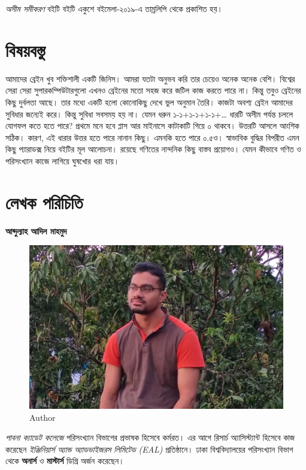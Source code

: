 \documentclass[
]{book}
\begin{document}
\emph{অসীম সমীকরণ} বইটি বইটি একুশে বইমেলা-২০১৯-এ তাম্রলিপি থেকে প্রকাশিত হয়।

\hypertarget{ux9acux9b7ux9dfux9acux9b8ux9a4}{%
\section{বিষয়বস্তু}\label{ux9acux9b7ux9dfux9acux9b8ux9a4}}

আমাদের ব্রেইন খুব শক্তিশালী একটি জিনিস। আমরা যতটা অনুভব করি তার চেয়েও অনেক অনেক বেশি। বিশ্বের সেরা সেরা সুপারকম্পিউটারগুলো এখনও ব্রেইনের মতো সহজ করে জটিল কাজ করতে পারে না। কিন্তু তবুও ব্রেইনের কিছু দুর্বলতা আছে। তার মধ্যে একটি হলো কোনোকিছু দেখে ভুল অনুমান তৈরি। কাজটা অবশ্য ব্রেইন আমাদের সুবিধার জন্যেই করে। কিন্তু সুবিধা সবসময় হয় না। যেমন ধরুন ১-১+১-১+১-১+\ldots{} ধারটি অসীম পর্যন্ত চললে যোগফল কতে হতে পারে? প্রথমে মনে হবে প্লাস আর মাইনাসে কাটাকাটি গিয়ে ০ থাকবে। উত্তরটি আসলে আংশিক সঠিক। কারণ, এই ধারার উত্তর হতে পারে নানান কিছু। এমনকি হতে পারে ০.৫ও। স্বাভাবিক বুদ্ধির বিপরীত এমন কিছু প্যারাডক্স নিয়ে বইটির মূল আলোচনা। রয়েছে গণিতের নান্দনিক কিছু বাস্তব প্রয়োগও। যেমন কীভাবে গণিত ও পরিসংখ্যান কাজে লাগিয়ে ঘুষখোর ধরা যায়।

\hypertarget{ux9b2ux996ux995-ux9aaux9b0ux99aux9a4}{%
\section{লেখক পরিচিতি}\label{ux9b2ux996ux995-ux9aaux9b0ux99aux9a4}}

\textbf{আব্দুল্যাহ আদিল মাহমুদ}

\begin{figure}

{\centering \includegraphics[width=0.5\linewidth]{mahmud} 

}

\caption{Author}\label{fig:author}
\end{figure}

\emph{পাবনা ক্যাডেট কলেজে} পরিসংখ্যান বিভাগের প্রভাষক হিসেবে কর্মরত। এর আগে রিসার্চ অ্যাসিস্ট্যান্ট হিসেবে কাজ করেছেন \emph{ইঞ্জিনিয়ার্স অ্যান্ড অ্যাডভাইজরস লিমিটেড (EAL)} প্রতিষ্ঠানে। ঢাকা বিশ্ববিদ্যালয়ের পরিসংখ্যান বিভাগ থেকে \textbf{অনার্স} ও \textbf{মাস্টার্স} ডিগ্রি অর্জন করেছেন।
\end{document}
